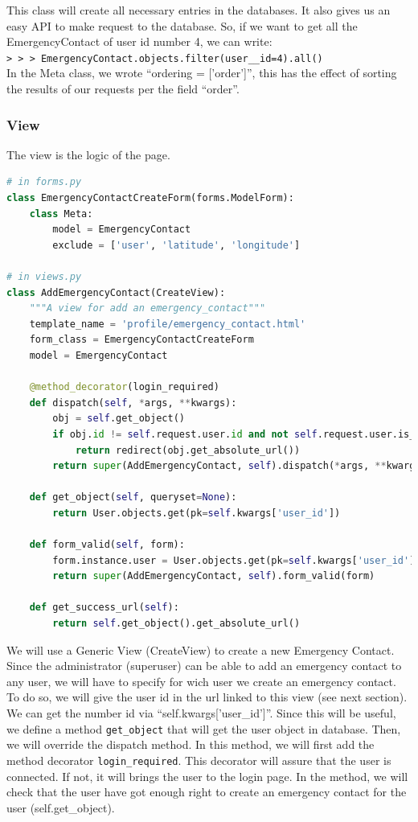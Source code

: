 \documentclass[11pt, a4paper]{article}   	%
\newcommand{\pcmd}[1]{\\\indent\indent\texttt{\footnotesize> > > #1}\\}
\begin{document}
This class will create all necessary entries in the databases. It also gives us an easy API to make request to the database. So, if we want to get all the EmergencyContact of user id number 4, we can write:
\pcmd{EmergencyContact.objects.filter(user\_\_id=4).all()}

In the Meta class, we wrote ``ordering = ['order']'', this has the effect of sorting the results of our requests per the field ``order''.

\subsubsection{View}
The view is the logic of the page.

\begin{lstlisting}[language=Python, basicstyle=\footnotesize]
# in forms.py
class EmergencyContactCreateForm(forms.ModelForm):
    class Meta:
        model = EmergencyContact
        exclude = ['user', 'latitude', 'longitude']

# in views.py
class AddEmergencyContact(CreateView):
    """A view for add an emergency_contact"""
    template_name = 'profile/emergency_contact.html'
    form_class = EmergencyContactCreateForm
    model = EmergencyContact

    @method_decorator(login_required)
    def dispatch(self, *args, **kwargs):
        obj = self.get_object()
        if obj.id != self.request.user.id and not self.request.user.is_superuser:
            return redirect(obj.get_absolute_url())
        return super(AddEmergencyContact, self).dispatch(*args, **kwargs)

    def get_object(self, queryset=None):
        return User.objects.get(pk=self.kwargs['user_id'])

    def form_valid(self, form):
        form.instance.user = User.objects.get(pk=self.kwargs['user_id'])
        return super(AddEmergencyContact, self).form_valid(form)

    def get_success_url(self):
        return self.get_object().get_absolute_url()
\end{lstlisting}

We will use a Generic View (CreateView) to create a new Emergency Contact. Since the administrator (superuser) can be able to add an emergency contact to any user, we will have to specify for wich user we create an emergency contact. To do so, we will give the user id in the url linked to this view (see next section). We can get the number id via ``self.kwargs['user\_id']''. Since this will be useful, we define a method \texttt{get\_object} that will get the user object in database. Then, we will override the dispatch method. In this method, we will first add the method decorator \texttt{login\_required}. This decorator will assure that the user is connected. If not, it will brings the user to the login page. In the method, we will check that the user have got enough right to create an emergency contact for the user (self.get\_object). 
\end{document}

